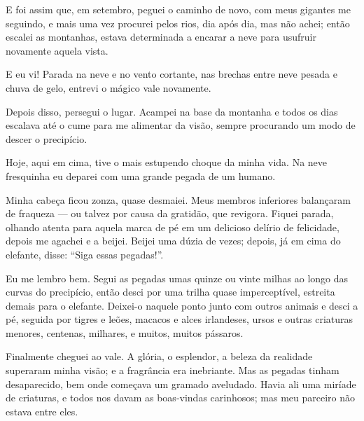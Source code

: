 E foi assim que, em setembro, peguei o caminho de novo, com meus gigantes me
seguindo, e mais uma vez procurei pelos rios, dia após dia, mas não achei;
então escalei as montanhas, estava determinada a encarar a neve para
usufruir novamente aquela vista.

E eu vi! Parada na neve e no vento cortante, nas brechas entre neve pesada e
chuva de gelo, entrevi o mágico vale novamente.

Depois disso, persegui o lugar. Acampei na base da montanha e todos os dias
escalava até o cume para me alimentar da visão, sempre procurando um modo de
descer o precipício.

 Hoje, aqui em cima, tive o mais estupendo choque da minha vida. Na neve
fresquinha eu deparei com uma grande pegada de um humano.

Minha cabeça ficou zonza, quase desmaiei. Meus membros inferiores balançaram de
fraqueza --- ou talvez por causa da gratidão, que revigora. Fiquei parada, olhando
atenta para aquela marca de pé em um delicioso delírio de felicidade, depois
me agachei e a beijei. Beijei uma dúzia de vezes; depois, já em cima do elefante, disse: “Siga essas pegadas!”.

Eu me lembro bem. Segui as pegadas umas quinze ou vinte milhas ao longo das curvas do
precipício, então desci por uma trilha quase imperceptível, estreita
demais para o elefante. Deixei-o naquele ponto junto com outros animais e
desci a pé, seguida por tigres e leões, macacos e alces irlandeses, ursos e outras
criaturas menores, centenas, milhares, e muitos, muitos pássaros.

Finalmente cheguei ao vale. A glória, o esplendor, a beleza da realidade superaram
minha visão; e a fragrância era inebriante. Mas as pegadas tinham desaparecido,
bem onde começava um gramado aveludado. Havia ali uma miríade de
criaturas, e todos nos davam as boas-vindas carinhosos; mas meu parceiro não estava entre eles.

